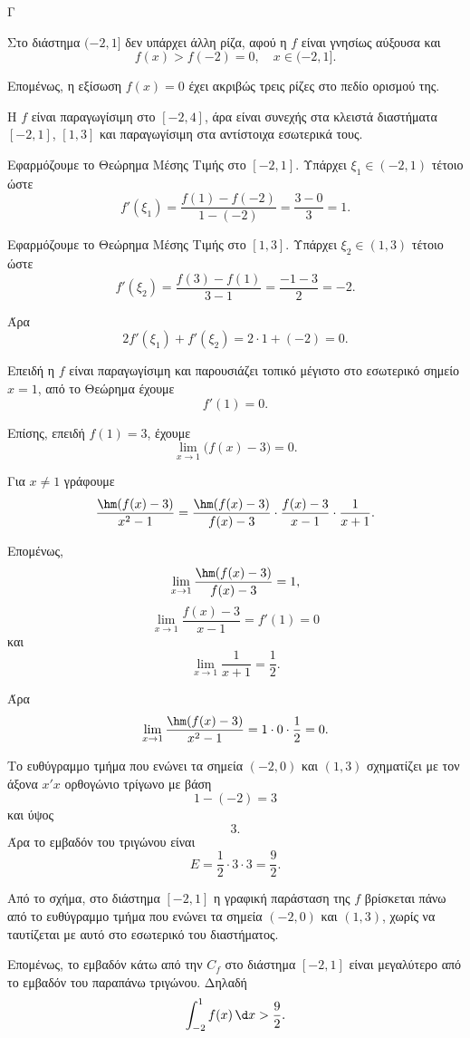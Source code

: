 \begin{thema}{Γ}
\begin{erwthma}
Στο διάστημα $(-2,1]$ δεν υπάρχει άλλη ρίζα, αφού η $f$ είναι γνησίως αύξουσα και
\[
f(x)>f(-2)=0,\quad x\in(-2,1].
\]

Επομένως, η εξίσωση $f(x)=0$ έχει ακριβώς τρεις ρίζες στο πεδίο ορισμού της.

\item Η $f$ είναι παραγωγίσιμη στο $[-2,4]$, άρα είναι συνεχής στα κλειστά διαστήματα $[-2,1]$, $[1,3]$ και παραγωγίσιμη στα αντίστοιχα εσωτερικά τους.

Εφαρμόζουμε το Θεώρημα Μέσης Τιμής στο $[-2,1]$. Υπάρχει $\xi_1\in(-2,1)$ τέτοιο ώστε
\[
f'(\xi_1)=\frac{f(1)-f(-2)}{1-(-2)}
=\frac{3-0}{3}=1.
\]

Εφαρμόζουμε το Θεώρημα Μέσης Τιμής στο $[1,3]$. Υπάρχει $\xi_2\in(1,3)$ τέτοιο ώστε
\[
f'(\xi_2)=\frac{f(3)-f(1)}{3-1}
=\frac{-1-3}{2}=-2.
\]

Άρα
\[
2f'(\xi_1)+f'(\xi_2)=2\cdot 1+(-2)=0.
\]

\item Επειδή η $f$ είναι παραγωγίσιμη και παρουσιάζει τοπικό μέγιστο στο εσωτερικό σημείο $x=1$, από το Θεώρημα  έχουμε
\[
f'(1)=0.
\]

Επίσης, επειδή $f(1)=3$, έχουμε
\[
\lim_{x\to 1}\bigl(f(x)-3\bigr)=0.
\]

Για $x\neq 1$ γράφουμε
\[
\frac{\hm(f(x)-3)}{x^2-1}
=
\frac{\hm(f(x)-3)}{f(x)-3}\cdot
\frac{f(x)-3}{x-1}\cdot
\frac{1}{x+1}.
\]

Επομένως,
\[
\lim_{x\to 1}\frac{\hm(f(x)-3)}{f(x)-3}=1,
\]
\[
\lim_{x\to 1}\frac{f(x)-3}{x-1}=f'(1)=0
\]
και
\[
\lim_{x\to 1}\frac{1}{x+1}=\frac{1}{2}.
\]

Άρα
\[
\lim_{x\to 1}\frac{\hm(f(x)-3)}{x^2-1}
=1\cdot 0\cdot \frac{1}{2}=0.
\]

\item Το ευθύγραμμο τμήμα που ενώνει τα σημεία $(-2,0)$ και $(1,3)$ σχηματίζει με τον άξονα $x'x$ ορθογώνιο τρίγωνο με βάση
\[
1-(-2)=3
\]
και ύψος
\[
3.
\]
Άρα το εμβαδόν του τριγώνου είναι
\[
E=\frac{1}{2}\cdot 3\cdot 3=\frac{9}{2}.
\]

Από το σχήμα, στο διάστημα $[-2,1]$ η γραφική παράσταση της $f$ βρίσκεται πάνω από το ευθύγραμμο τμήμα που ενώνει τα σημεία $(-2,0)$ και $(1,3)$, χωρίς να ταυτίζεται με αυτό στο εσωτερικό του διαστήματος.

Επομένως, το εμβαδόν κάτω από την $C_f$ στο διάστημα $[-2,1]$ είναι μεγαλύτερο από το εμβαδόν του παραπάνω τριγώνου. Δηλαδή
\[
\int_{-2}^1 f(x)\,\d x>\frac{9}{2}.
\]
\end{erwthma}
\end{thema}

